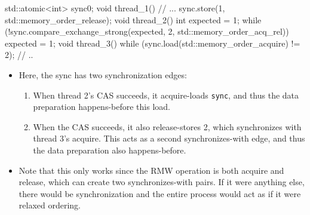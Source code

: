 \documentclass[11pt, a4paper]{article}
\theoremstyle{definition}
\theoremstyle{remark}
\newcommand{\code}[1]{\lstinline|#1|}
\begin{document}
\begin{cppcode}
std::atomic<int> sync{0};
void thread_1() {
    // ...
    sync.store(1, std::memory_order_release);
}
void thread_2() {
    int expected = 1;
    while (!sync.compare_exchange_strong(expected, 2, std::memory_order_acq_rel)) expected = 1;
}
void thread_3() {
    while (sync.load(std::memory_order_acquire) != 2);
    // ..
}
\end{cppcode}
\begin{itemize}
    \item Here, the sync has two synchronization edges:
    \begin{enumerate}
        \item When thread 2's CAS succeeds, it acquire-loads \code{sync}, and thus the data preparation happens-before this load.
        \item When the CAS succeeds, it also release-stores 2, which synchronizes with thread 3's acquire. This acts as a second synchronizes-with edge, and thus the data preparation also happens-before.
    \end{enumerate}
    \item Note that this only works since the RMW operation is both acquire and release, which can create two synchronizes-with pairs. If it were anything else, there would be synchronization and the entire process would act as if it were relaxed ordering.
\end{itemize}
\end{document}
